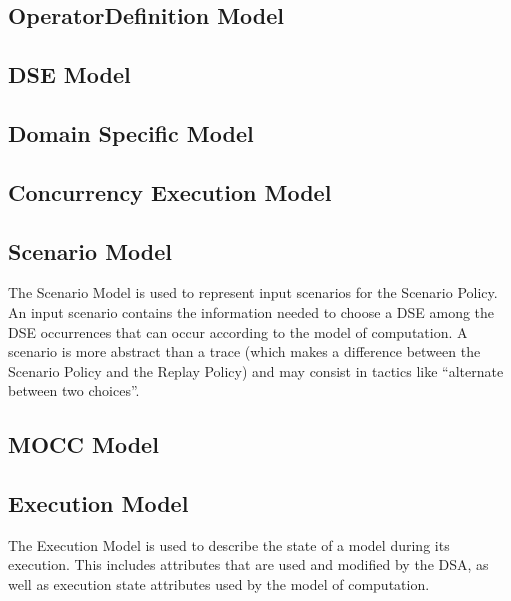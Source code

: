 \documentclass{gemoc} %
\begin{document}

\subsection{OperatorDefinition Model}


\subsection{DSE Model}


\subsection{Domain Specific Model}


\subsection{Concurrency Execution Model}


\subsection{Scenario Model}
The Scenario Model is used to represent input scenarios for the Scenario Policy. An input scenario contains the information needed to choose a DSE among the DSE occurrences that can occur according to the model of computation. A scenario is more abstract than a trace (which makes a difference between the Scenario Policy and the Replay Policy) and may consist in tactics like ``alternate between two choices''.

\subsection{MOCC Model}


\subsection{Execution Model}
The Execution Model is used to describe the state of a model during its execution. This includes attributes that are used and modified by the DSA, as well as execution state attributes used by the model of computation.
\end{document}
